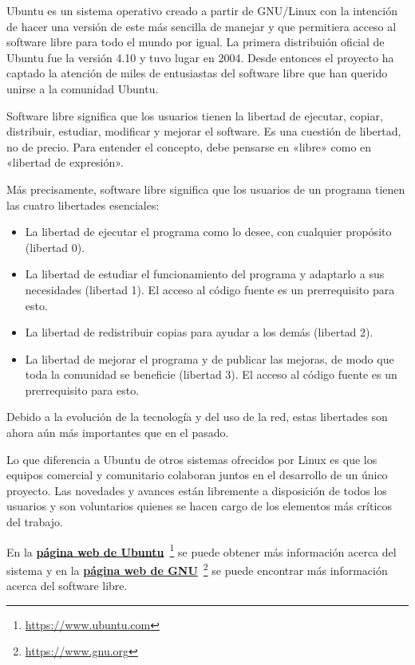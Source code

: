 Ubuntu es un sistema operativo creado a partir de GNU/Linux con la intención 
de hacer una versión de este más sencilla de manejar y que permitiera acceso
al software libre para todo el mundo por igual. La primera distribuión oficial
de Ubuntu fue la versión 4.10 y tuvo lugar en 2004. Desde entonces el proyecto
ha captado la atención de miles de entusiastas del software libre que han 
querido unirse a la comunidad Ubuntu.

Software libre significa que los usuarios tienen la libertad de ejecutar,
copiar, distribuir, estudiar, modificar y mejorar el software. Es una cuestión
de libertad, no de precio. Para entender el concepto, debe pensarse en «libre»
como en «libertad de expresión».

Más precisamente, software libre significa que los usuarios de un programa 
tienen las cuatro libertades esenciales:
\begin{itemize}
\item La libertad de ejecutar el programa como lo desee, con cualquier propósito
(libertad 0).
\item La libertad de estudiar el funcionamiento del programa y adaptarlo a sus
necesidades (libertad 1). El acceso al código fuente es un prerrequisito para 
esto.
\item La libertad de redistribuir copias para ayudar a los demás (libertad 2).
\item La libertad de mejorar el programa y de publicar las mejoras, de modo que
toda la comunidad se beneficie (libertad 3). El acceso al código fuente es un 
prerrequisito para esto.
\end{itemize}

Debido a la evolución de la tecnología y del uso de la red, estas libertades
son ahora aún más importantes que en el pasado.

Lo que diferencia a Ubuntu de otros sistemas ofrecidos por Linux es que los 
equipos comercial y comunitario colaboran juntos en el desarrollo de un único
proyecto. Las novedades y avances están libremente a disposición de todos los
usuarios y son voluntarios quienes se hacen cargo de los elementos más críticos
del trabajo.

En la \href{https://www.ubuntu.com}
  {\textbf{página web de Ubuntu}}\
  \footnote{\url{https://www.ubuntu.com}}
se puede obtener más información acerca del sistema y en la 
\href{https://www.gnu.org}
  {\textbf{página web de GNU}}\
  \footnote{\url{https://www.gnu.org}}
se puede encontrar más información acerca del software libre. 

